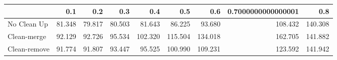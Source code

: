 \begin{tabular}{lrrrrrrrr}
\toprule
{} &    0.1 &    0.2 &    0.3 &     0.4 &     0.5 &     0.6 & 0.7000000000000001 &     0.8 \\
\midrule
No Clean Up  & 81.348 & 79.817 & 80.503 &  81.643 &  86.225 &  93.680 &            108.432 & 140.308 \\
Clean-merge  & 92.129 & 92.726 & 95.534 & 102.320 & 115.504 & 134.018 &            162.705 & 141.882 \\
Clean-remove & 91.774 & 91.807 & 93.447 &  95.525 & 100.990 & 109.231 &            123.592 & 141.942 \\
\bottomrule
\end{tabular}
